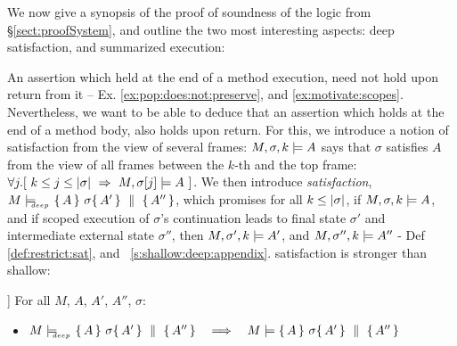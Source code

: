 

We now give a synopsis of the proof of soundness of the logic from \S \ref{sect:proofSystem}, and outline the 
 two most interesting aspects: deep satisfaction, and summarized execution:

 
\label{s:scoped:valid}
An assertion which held at the end of a method execution, need not hold upon return from it -- \cf Ex. \ref{ex:pop:does:not:preserve}, and   \ref{ex:motivate:scopes}. 
Nevertheless, we want to be able to deduce that an assertion which holds at the end of a method body, also holds upon return. For this, we introduce a notion of satisfaction from the view of several frames: %
 $ M,\sigma ,{k} \models {A} $   says that $\sigma$ satisfies $A$ from the view  of all frames between the $k$-th  and the top frame:
\ie $\forall j. [\  k\leq j \leq \DepthSt \sigma \ \Rightarrow \ M, \RestictTo \sigma j \models A \ ]$.
We then introduce \emph{\strong satisfaction},  $M \models\!\!\!\!_{_{deep}}\   \{\, A \, \}\ \sigma \{\, A' \, \} \, \,\parallel\,\, \{\, A'' \, \} $, which promises for all $k\leq |\sigma|$,  
if $ M,\sigma ,{k} \models {A} $, and if  scoped execution of $\sigma$'s continuation leads to final state $\sigma'$ and intermediate external state $\sigma''$, then
 $ M,\sigma' ,{k} \models {A'} $, and  $ M,\sigma'' ,{k} \models {A''} $
 - \cf Def \ref{def:restrict:sat}, and  \A\ \ref{s:shallow:deep:appendix}.
\Strong satisfaction is stronger than shallow:   
 
\begin{lemma}]
For all $M$, $A$, $A'$, $A''$, $\sigma$:  
\begin{itemize}
\item
 $M \models\!\!\!\!_{_{deep}}\   \{\, A \, \}\ \sigma \{\, A' \, \} \, \,\parallel\,\, \{\, A'' \, \}    \ \ \ \Longrightarrow \ \ \   M \models  \{\, A \, \}\ \sigma \{\, A' \, \} \, \,\parallel\,\, \{\, A'' \, \} $


\end{itemize}
\end{lemma}

